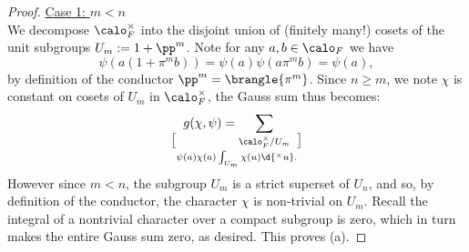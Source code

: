 \documentclass[11pt, x11names, openany]{book}
\begin{document}
\begin{proof}
\underline{Case 1: $m < n$}\\
We decompose $\calo_F^\times$ into the disjoint union of (finitely many!) cosets of the unit subgroups $U_m := 1 + \pp^m$. Note for any $a, b \in \calo_F$ we have
\begin{equation*}
    \psi(a(1 + \pi^m b)) = \psi(a) \psi(a\pi^m b) = \psi(a),
\end{equation*}
by definition of the conductor $\pp^m = \brangle{\pi^m}$. Since $n \geq m$, we note $\chi$ is constant on cosets of $U_m$ in $\calo_F^\times$, the Gauss sum thus becomes:
\begin{equation*}
    g(\chi, \psi) = \sum_{\calo_F^\times/U_m} \brack{\psi(a) \chi(a) \int_{U_m} \chi(u) \d{^\times  u}}.
\end{equation*}
However since $m < n$, the subgroup $U_m$ is a strict superset of $U_n$, and so, by definition of the conductor, the character $\chi$ is non-trivial on $U_m$. Recall the integral of a nontrivial character over a compact subgroup is zero, which in turn makes the entire Gauss sum zero, as desired. This proves (a).


\end{proof}
\end{document}
